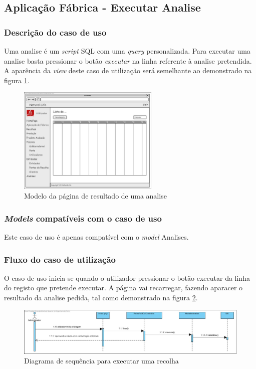 \subsection{Aplicação Fábrica - Executar Analise}
\subsubsection*{Descrição do caso de uso}
Uma analise é um \textit{script} SQL com uma \textit{query} personalizada. Para executar uma analise basta pressionar o botão \textit{executar} na linha referente à analise pretendida. A aparência da \textit{view} deste caso de utilização será semelhante ao demonstrado na figura \ref{fig:di_analise}.

\begin{figure}[H] 
	\begin{center}
		\includegraphics[width=0.60\textwidth,keepaspectratio]{figuras/Diagramas_vp/DI_Painel_1_Lista.jpg}
		\caption{Modelo da página de resultado de uma analise}
		\label{fig:di_analise} 
	\end{center}
\end{figure}

\subsubsection*{\textit{Models} compatíveis com o caso de uso}
Este caso de uso é apenas compatível com o \textit{model} Analises.

\subsubsection*{Fluxo do caso de utilização}
O caso de uso inicia-se quando o utilizador pressionar o botão executar da linha do registo que pretende executar. A página vai recarregar, fazendo aparacer o resultado da analise pedida, tal como demonstrado na figura \ref{fig:sd_executar analise}.


\begin{figure}[H] 
	\begin{center}
		\includegraphics[width=\textwidth,keepaspectratio]{figuras/Diagramas_vp/SD_Painel_7_Executar_Analise.jpg}
		\caption{Diagrama de sequência para executar uma recolha}
		\label{fig:sd_executar analise} 
	\end{center}
\end{figure}